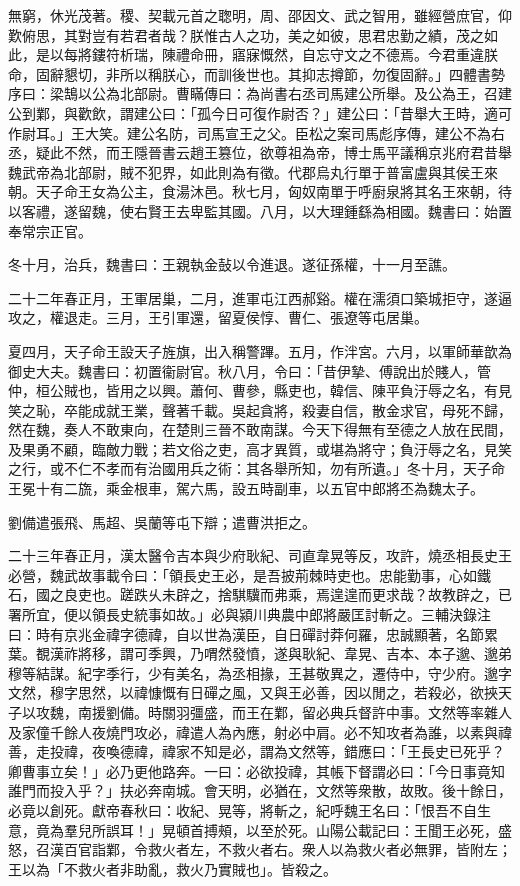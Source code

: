 \begin{pinyinscope}
無窮，休光茂著。稷、契載元首之聦明，周、邵因文、武之智用，雖經營庶官，仰歎俯思，其對豈有若君者哉？朕惟古人之功，美之如彼，思君忠勤之績，茂之如此，是以每將鏤符析瑞，陳禮命冊，寤寐慨然，自忘守文之不德焉。今君重違朕命，固辭懇切，非所以稱朕心，而訓後世也。其抑志撙節，勿復固辭。」四體書勢序曰：梁鵠以公為北部尉。曹瞞傳曰：為尚書右丞司馬建公所舉。及公為王，召建公到鄴，與歡飲，謂建公曰：「孤今日可復作尉否？」建公曰：「昔舉大王時，適可作尉耳。」王大笑。建公名防，司馬宣王之父。臣松之案司馬彪序傳，建公不為右丞，疑此不然，而王隱晉書云趙王篡位，欲尊祖為帝，博士馬平議稱京兆府君昔舉魏武帝為北部尉，賊不犯界，如此則為有徵。代郡烏丸行單于普富盧與其侯王來朝。天子命王女為公主，食湯沐邑。秋七月，匈奴南單于呼廚泉將其名王來朝，待以客禮，遂留魏，使右賢王去卑監其國。八月，以大理鍾繇為相國。魏書曰：始置奉常宗正官。

冬十月，治兵，魏書曰：王親執金鼔以令進退。遂征孫權，十一月至譙。

二十二年春正月，王軍居巢，二月，進軍屯江西郝谿。權在濡須口築城拒守，遂逼攻之，權退走。三月，王引軍還，留夏侯惇、曹仁、張遼等屯居巢。

夏四月，天子命王設天子旌旗，出入稱警蹕。五月，作泮宮。六月，以軍師華歆為御史大夫。魏書曰：初置衞尉官。秋八月，令曰：「昔伊摯、傅說出於賤人，管仲，桓公賊也，皆用之以興。蕭何、曹參，縣吏也，韓信、陳平負汙辱之名，有見笑之恥，卒能成就王業，聲著千載。吳起貪將，殺妻自信，散金求官，母死不歸，然在魏，奏人不敢東向，在楚則三晉不敢南謀。今天下得無有至德之人放在民間，及果勇不顧，臨敵力戰；若文俗之吏，高才異質，或堪為將守；負汙辱之名，見笑之行，或不仁不孝而有治國用兵之術：其各舉所知，勿有所遺。」冬十月，天子命王冕十有二旒，乘金根車，駕六馬，設五時副車，以五官中郎將丕為魏太子。

劉備遣張飛、馬超、吳蘭等屯下辯；遣曹洪拒之。

二十三年春正月，漢太醫令吉本與少府耿紀、司直韋晃等反，攻許，燒丞相長史王必營，魏武故事載令曰：「領長史王必，是吾披荊棘時吏也。忠能勤事，心如鐵石，國之良吏也。蹉跌乆未辟之，捨騏驥而弗乘，焉遑遑而更求哉？故教辟之，已署所宜，便以領長史統事如故。」必與潁川典農中郎將嚴匡討斬之。三輔決錄注曰：時有京兆金禕字德禕，自以世為漢臣，自日磾討莽何羅，忠誠顯著，名節累葉。覩漢祚將移，謂可季興，乃喟然發憤，遂與耿紀、韋晃、吉本、本子邈、邈弟穆等結謀。紀字季行，少有美名，為丞相掾，王甚敬異之，遷侍中，守少府。邈字文然，穆字思然，以禕慷慨有日磾之風，又與王必善，因以閒之，若殺必，欲挾天子以攻魏，南援劉備。時關羽彊盛，而王在鄴，留必典兵督許中事。文然等率雜人及家僮千餘人夜燒門攻必，禕遣人為內應，射必中肩。必不知攻者為誰，以素與禕善，走投禕，夜喚德禕，禕家不知是必，謂為文然等，錯應曰：「王長史已死乎？卿曹事立矣！」必乃更他路奔。一曰：必欲投禕，其帳下督謂必曰：「今日事竟知誰門而投入乎？」扶必奔南城。會天明，必猶在，文然等衆散，故敗。後十餘日，必竟以創死。獻帝春秋曰：收紀、晃等，將斬之，紀呼魏王名曰：「恨吾不自生意，竟為羣兒所誤耳！」晃頓首搏頰，以至於死。山陽公載記曰：王聞王必死，盛怒，召漢百官詣鄴，令救火者左，不救火者右。衆人以為救火者必無罪，皆附左；王以為「不救火者非助亂，救火乃實賊也」。皆殺之。


\end{pinyinscope}
